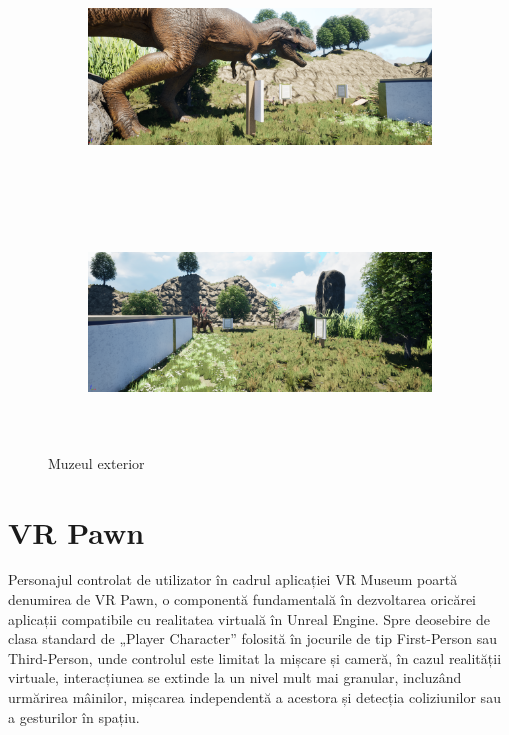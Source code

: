 \begin{figure}[h!]
    \centering
    \begin{subfigure}{0.49\textwidth}
        \includegraphics[width=\linewidth, height=6cm]{continut/capitol3/figuri/afara.png}
        \label{fig:outside}
    \end{subfigure}
    \hfill
    \begin{subfigure}{0.49\textwidth}
        \includegraphics[width=\linewidth, height=6cm]{continut/capitol3/figuri/afara2.png}
        \label{fig:outside}
    \end{subfigure}
    \caption{Muzeul exterior}
\end{figure}

\newpage 

\section{VR Pawn}

Personajul controlat de utilizator în cadrul aplicației VR Museum poartă denumirea de VR Pawn, o componentă fundamentală în dezvoltarea oricărei aplicații compatibile cu realitatea virtuală în Unreal Engine. Spre deosebire de clasa standard de „Player Character” folosită în jocurile de tip First-Person sau Third-Person, unde controlul este limitat la mișcare și cameră, în cazul realității virtuale, interacțiunea se extinde la un nivel mult mai granular, incluzând urmărirea mâinilor, mișcarea independentă a acestora și detecția coliziunilor sau a gesturilor în spațiu.

